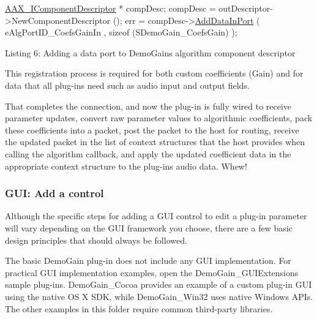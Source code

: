 \begin{DoxyCode}
\hyperlink{a00088}{AAX\_IComponentDescriptor} * compDesc;
compDesc = outDescriptor->NewComponentDescriptor ();
err = compDesc->\hyperlink{a00088_a230293b9f6bb413626cd487ca501df75}{AddDataInPort} (
    eAlgPortID\_CoefsGainIn ,
    \textcolor{keyword}{sizeof} (SDemoGain\_CoefsGain) ); 
\end{DoxyCode}
  Listing 6\+: Adding a data port to Demo\+Gain\textquotesingle{}s algorithm component descriptor

This registration process is required for both custom coefficients (Gain) and for data that all plug-\/ins need such as audio input and output fields.

That completes the connection, and now the plug-\/in is fully wired to receive parameter updates, convert raw parameter values to algorithmic coefficients, pack these coefficients into a packet, post the packet to the host for routing, receive the updated packet in the list of context structures that the host provides when calling the algorithm callback, and apply the updated coefficient data in the appropriate context structure to the plug-\/in\textquotesingle{}s audio data. Whew! \hypertarget{a00324_subsection__gui_add_a_control}{}\subsubsection{G\+U\+I\+: Add a control}\label{a00324_subsection__gui_add_a_control}
 Although the specific steps for adding a G\+U\+I control to edit a plug-\/in parameter will vary depending on the G\+U\+I framework you choose, there are a few basic design principles that should always be followed.

The basic Demo\+Gain plug-\/in does not include any G\+U\+I implementation. For practical G\+U\+I implementation examples, open the Demo\+Gain\+\_\+\+G\+U\+I\+Extensions sample plug-\/ins. Demo\+Gain\+\_\+\+Cocoa provides an example of a custom plug-\/in G\+U\+I using the native O\+S X S\+D\+K, while Demo\+Gain\+\_\+\+Win32 uses native Windows A\+P\+Is. The other examples in this folder require common third-\/party libraries.


